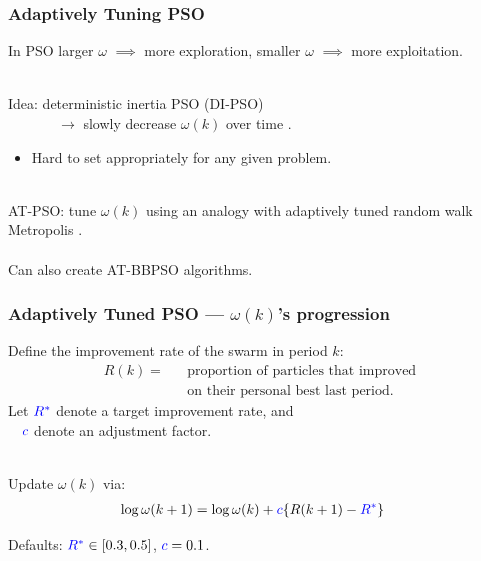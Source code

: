 \documentclass[xcolor=dvipsnames]{beamer}
\begin{document}
\begin{frame}
\frametitle{Adaptively Tuning PSO}
In PSO larger $\omega$ $\implies$ more exploration, smaller $\omega$ $\implies$ more exploitation.\\~\\

\pause

Idea: deterministic inertia PSO (DI-PSO) \\
\ \ \ \ \ \ \ $\to$ slowly decrease $\omega(k)$ over time \citep*{eberhart2000comparing}.
\begin{itemize}
\item Hard to set appropriately for any given problem.\\~\\
\end{itemize}

\pause

AT-PSO: tune $\omega(k)$ using an analogy with adaptively tuned random walk Metropolis \citep*{andrieu2008tutorial}.\\~\\

Can also create AT-BBPSO algorithms.
\end{frame}


\begin{frame}
\frametitle{Adaptively Tuned PSO --- $\omega(k)$'s progression}
Define the improvement rate of the swarm in period $k$:
\begin{align*}
R(k) = &&  \mbox{proportion of particles that improved}\\
       &&  \mbox{on their personal best last period.}
\end{align*}
\pause
Let ${\color{blue}R^*}$ denote a target improvement rate, and\\
\ \ ${\color{blue}c}$ denote an adjustment factor.\\~

Update $\omega(k)$ via:
\begin{align*}
\log \omega(k+1) &= \log\omega(k) + {\color{blue}c}\{R(k+1) - {\color{blue}R^*}\}
\end{align*}

\pause

Defaults: ${\color{blue}R^*}\in[0.3, 0.5]$, ${\color{blue}c} = 0.1$.
\end{frame}
\end{document}
